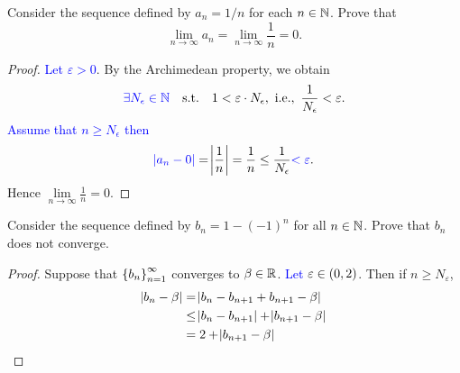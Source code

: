 \documentclass[11pt,openany]{article}
\begin{document}
\begin{example*}
	Consider the sequence defined by $a_n=1/n$ for each $n\in\mathbb{N}$. Prove that \[
	\lim\limits_{n\to\infty}a_n=\lim\limits_{n\to\infty}\frac{1}{n}=0.
	\]
	\begin{center}
		
	\end{center}
	\begin{proof}
		\textcolor{blue}{Let $\varepsilon>0$}. By the Archimedean property, we obtain \[
		\textcolor{blue}{\exists N_\epsilon\in\N}\quad \text{s.t.}\quad 1<\varepsilon\cdot N_\epsilon,\ \ie,\ \frac{1}{N_\epsilon}<\varepsilon.
		\] \textcolor{blue}{Assume that $n\geq N_\epsilon$ then} \[
		\textcolor{blue}{\abs{a_n-0}}=\abs{\frac{1}{n}}=\frac{1}{n}\leq\frac{1}{N_\epsilon}
		\textcolor{blue}{<\varepsilon}.
		\] Hence $\displaystyle\lim\limits_{n\to\infty}\frac{1}{n}=0$.
	\end{proof}
\end{example*}

\begin{example*}
	Consider the sequence defined by $b_n=1-(-1)^n$ for all $n\in\mathbb{N}$. Prove that $b_n$ does not converge. 
	\begin{center}
		
	\end{center}
	\begin{proof}
		Suppose that $\set{b_n}_{n=1}^\infty$ converges to $\beta\in\mathbb{R}$. \textcolor{blue}{Let $\varepsilon\in\intoo{0,2}$}. Then if $n\geq N_\varepsilon$, \begin{align*}
			\abs{b_n-\beta}&=\abs{b_n-b_{n+1}+b_{n+1}-\beta} \\
			&\leq\abs{b_n-b_{n+1}}+\abs{b_{n+1}-\beta} \\
			&=2+\abs{b_{n+1}-\beta}
		\end{align*}
	\end{proof}
\end{example*}

\newpage
\end{document}
